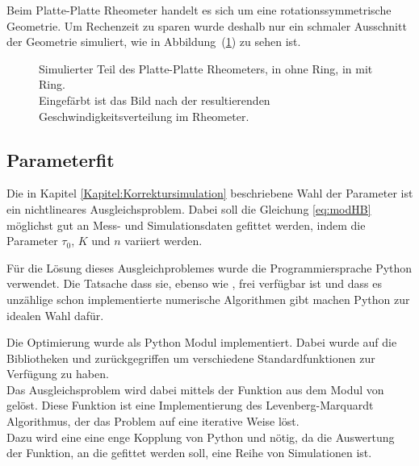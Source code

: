 Beim Platte-Platte Rheometer handelt es sich um eine rotationssymmetrische Geometrie. Um Rechenzeit zu sparen wurde deshalb nur ein schmaler Ausschnitt der Geometrie simuliert, wie in Abbildung~(\ref{fig:plattePlatteRheoSim}) zu sehen ist.\\
\begin{figure}
\centering
{}
\caption{Simulierter Teil des Platte-Platte Rheometers, in  ohne Ring, in  mit Ring.\\
Eingefärbt ist das Bild nach der resultierenden Geschwindigkeitsverteilung im Rheometer.}
\label{fig:plattePlatteRheoSim}
\end{figure}
%
\subsection{Parameterfit}
Die in Kapitel \ref{Kapitel:Korrektursimulation} beschriebene Wahl der Parameter ist ein nichtlineares Ausgleichsproblem. Dabei soll die Gleichung \eqref{eq:modHB} möglichst gut an Mess- und Simulationsdaten gefittet werden, indem die Parameter $\tau_0$, $K$ und $n$ variiert werden.

Für die Lösung dieses Ausgleichproblemes wurde die Programmiersprache Python verwendet. Die Tatsache dass sie, ebenso wie \openfoam{}, frei verfügbar ist und dass es unzählige schon implementierte numerische Algorithmen gibt machen Python zur idealen Wahl dafür.

Die Optimierung wurde als Python Modul  implementiert. Dabei wurde auf die Bibliotheken  und  \cite{scipy} zurückgegriffen um verschiedene Standardfunktionen zur Verfügung zu haben.\\
Das Ausgleichsproblem wird dabei mittels der Funktion  aus dem Modul  von  gelöst.
Diese Funktion ist eine Implementierung des Levenberg-Marquardt Algorithmus, der das Problem auf eine iterative Weise löst.\\
Dazu wird eine eine enge Kopplung von Python und \openfoam{} nötig, da die Auswertung der Funktion, an die gefittet werden soll, eine Reihe von Simulationen ist.

